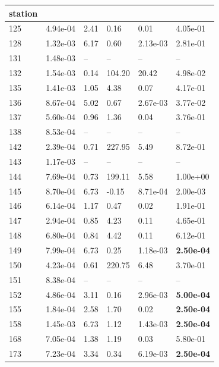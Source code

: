 \begin{figure}[htbp!]
{\begin{minipage}[t]{0.48\linewidth}
\begin{tabular}{llllll}
        station &  &  &  &  &  \\
        \midrule
                    125 & 4.94e-04 & 2.41 & 0.16 & 0.01 & 4.05e-01\\
                    128 & 1.32e-03 & 6.17 & 0.60 & 2.13e-03 & 2.81e-01\\
                    131 & 1.48e-03 & -- & -- & -- & --\\
                    132 & 1.54e-03 & 0.14 & 104.20 & 20.42 & 4.98e-02\\
                    135 & 1.41e-03 & 1.05 & 4.38 & 0.07 & 4.17e-01\\
                    136 & 8.67e-04 & 5.02 & 0.67 & 2.67e-03 & 3.77e-02\\
                    137 & 5.60e-04 & 0.96 & 1.36 & 0.04 & 3.76e-01\\
                    138 & 8.53e-04 & -- & -- & -- & --\\
                    142 & 2.39e-04 & 0.71 & 227.95 & 5.49 & 8.72e-01\\
                    143 & 1.17e-03 & -- & -- & -- & --\\
                    144 & 7.69e-04 & 0.73 & 199.11 & 5.58 & 1.00e+00\\
                    145 & 8.70e-04 & 6.73 & -0.15 & 8.71e-04 & 2.00e-03\\
                    146 & 6.14e-04 & 1.17 & 0.47 & 0.02 & 1.91e-01\\
                    147 & 2.94e-04 & 0.85 & 4.23 & 0.11 & 4.65e-01\\
                    148 & 6.80e-04 & 0.84 & 4.42 & 0.11 & 6.12e-01\\
                    149 & 7.99e-04 & 6.73 & 0.25 & 1.18e-03 & \textbf{2.50e-04}\\
                    150 & 4.23e-04 & 0.61 & 220.75 & 6.48 & 3.70e-01\\
                    151 & 8.38e-04 & -- & -- & -- & --\\
                    152 & 4.86e-04 & 3.11 & 0.16 & 2.96e-03 & \textbf{5.00e-04}\\
                    155 & 1.84e-04 & 2.58 & 1.70 & 0.02 & \textbf{2.50e-04}\\
                    158 & 1.45e-03 & 6.73 & 1.12 & 1.43e-03 & \textbf{2.50e-04}\\
                    168 & 7.05e-04 & 1.38 & 1.19 & 0.03 & 5.80e-01\\
                    173 & 7.23e-04 & 3.34 & 0.34 & 6.19e-03 & \textbf{2.50e-04}\\

\end{tabular}
\end{minipage}}
\end{figure}
